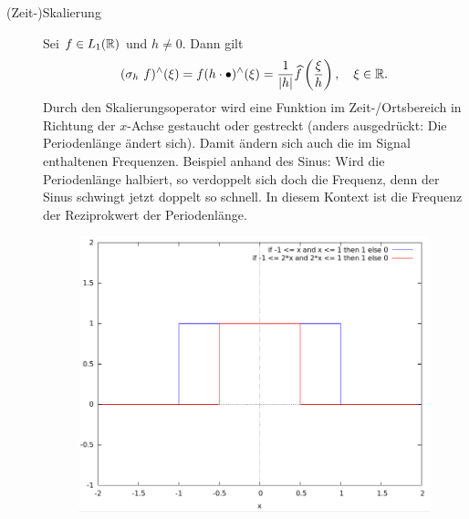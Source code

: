 \begin{remark}
\begin{description}
		\item [(Zeit-)Skalierung] Sei $ f \in L_{1}(\mathbb{R}) $ und $ h \neq 0 $. Dann gilt
  		\[
      		(\sigma_{h} \ f)^{\wedge}(\xi) 
      	= f(h \cdot \bullet)^{\wedge}(\xi) 
      	= \frac{1}{|h|} \widehat{f} \left( \frac{\xi}{h} \right), \quad \xi \in \mathbb{R}.
  		\]
  	Durch den Skalierungsoperator wird eine Funktion im Zeit-/Ortsbereich in Richtung der $x$-Achse 
  	gestaucht oder gestreckt (anders ausgedrückt: Die Periodenlänge ändert sich). Damit ändern sich
  	auch die im Signal enthaltenen Frequenzen. Beispiel anhand des Sinus: Wird die Periodenlänge 
    halbiert, so verdoppelt sich doch die Frequenz, denn der Sinus schwingt jetzt doppelt so 
    schnell. In diesem Kontext ist die Frequenz der Reziprokwert der Periodenlänge.
    
    \begin{figure}[ht]
          \centering
          \begin{minipage}{0.49\linewidth}
            \centering
            \includegraphics[width=\linewidth]{Bilder/FT_Skalierung_Zeit}
          \end{minipage}
          \begin{minipage}{0.49\linewidth}
            \centering

\end{minipage}
\end{figure}
\end{description}
\end{remark}
